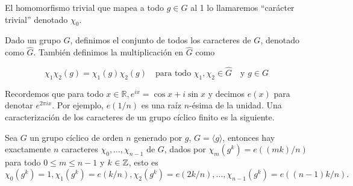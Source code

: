  El homomorfismo trivial que mapea a todo $g\in G$ al 1 lo llamaremos ``carácter trivial'' denotado $\chi_0$.\\

 \begin{definition}
 Dado un grupo $G$, definimos el conjunto de todos los caracteres de $G$, denotado como $\widehat{G}$. También definimos la multiplicación en $\widehat{G}$ como

$$\chi_1\chi_2(g)=\chi_1(g)\chi_2(g) \quad \text{para todo } \chi_1,\chi_2\in \widehat{G} \quad \text{y } g\in G$$

 \end{definition}

 Recordemos que para todo $x \in \mathbb{R}, e^{ix}=\cos x+i \sin x$ y decimos $e(x)$ para denotar $e^{2 \pi i x}$. Por ejemplo, $e(1 / n)$ es una raíz $n$-ésima de la unidad. Una caracterización de los caracteres de un grupo cíclico finito es la siguiente.

\begin{theorem}
Sea $G$ un grupo cíclico de orden $n$ generado por $g$, $G=\langle g\rangle$, entonces hay exactamente $n$ caracteres $\chi_0,\ldots,\chi_{n-1}$ de $G$, dados por $\chi_m(g^k)=e\left((mk)/n\right)$ para todo $0\leq m\leq n-1$ y $k\in \mathbb{Z}$, esto es 
$$\chi_0(g^k)=1, \chi_1(g^k)=e(k/n),\chi_2(g^k)=e(2k/n),\ldots,\chi_{n-1}(g^k)=e((n-1)k/n).$$
\end{theorem}

